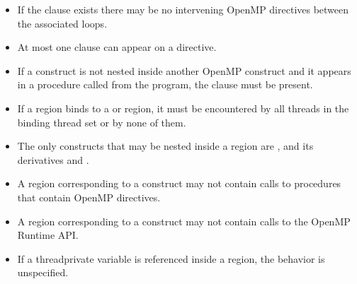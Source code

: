 \begin{itemize}
  \item If the  clause exists there may be no intervening OpenMP
    directives between the associated loops.



  \item At most one  clause can appear on a  directive.

  \item If a  construct is not nested inside another OpenMP
      construct and it appears in a procedure called from the program, the
       clause must be present.

  \item If a  region binds to a  or 
      region, it must be encountered by all threads in the binding thread set
      or by none of them.

  \item The only constructs that may be nested inside a  region
    are ,  and its derivatives and .


  \item A  region corresponding to a  construct may not
    contain calls to procedures that contain OpenMP directives. 


\item A  region corresponding to a  construct may not
  contain calls to the OpenMP Runtime API.

\item If a threadprivate variable is referenced inside a  region, the behavior is unspecified.

\end{itemize}

